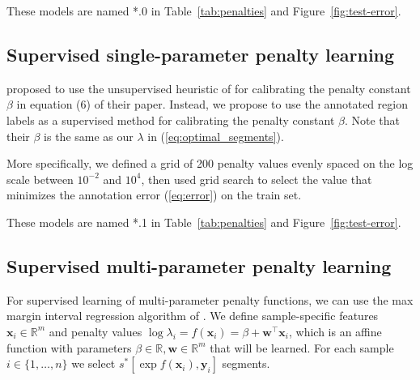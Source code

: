 \documentclass{article}
\DeclareMathOperator*{\argmin}{arg\,min}
\newcommand{\RR}{\mathbb R}
\begin{document}
These models are named *.0 in Table~\ref{tab:penalties} and
Figure~\ref{fig:test-error}.

\subsection{Supervised single-parameter penalty learning}
\label{sec:supervised-single}

\citet{cleynen2013segmentation} proposed to use the un\-supervised
heuristic of \citet{Lav05} for calibrating the penalty constant
$\beta$ in equation (6) of their paper. Instead, we propose to use the
annotated region labels as a super\-vised method for calibrating the
penalty constant $\beta$. Note that their $\beta$ is the same as our
$\lambda$ in (\ref{eq:optimal_segments}). 

More specifically, we defined a grid of 200 penalty values evenly
spaced on the log scale between $10^{-2}$ and $10^4$, then used grid
search to select the value that minimizes the annotation error
(\ref{eq:error}) on the train set.

These models are named *.1 in Table~\ref{tab:penalties} and
Figure~\ref{fig:test-error}.

\subsection{Supervised multi-parameter penalty learning}
\label{sec:supervised-multi}

For supervised learning of multi-parameter penalty functions, we can
use the max margin interval regression algorithm of
\citet{HOCKING-penalties}.
We define sample-specific features $\mathbf x_i\in\RR^m$ and penalty
values $\log \lambda_i = f(\mathbf x_i) = \beta + \mathbf w^\intercal
\mathbf x_i$, which is an affine function with parameters
$\beta\in\RR,\mathbf w\in\RR^m$ that will be learned. 
For each sample
$i\in\{1,\dots, n\}$ we select $s^*[\exp f(\mathbf x_i), \mathbf y_i]$
segments.

\end{document}
